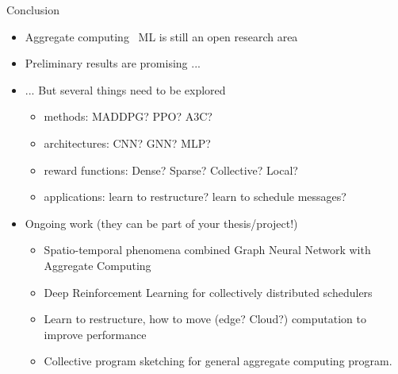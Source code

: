\documentclass[presentation, 8pt]{beamer}\mode<presentation>{\usetheme{AMSBolognaFC}}
\begin{document}
\begin{frame}{Conclusion}
\begin{itemize}
	\item Aggregate computing \faPlus \, ML is still an open research area
	\item Preliminary results are promising ...
	\item ... But several things need to be explored
	\begin{itemize}
		\item methods: MADDPG? PPO? A3C?
		\item architectures: CNN? GNN? MLP?
		\item reward functions: Dense? Sparse? Collective? Local?
		\item applications: learn to restructure? learn to schedule messages?
	\end{itemize}
	\item Ongoing work (they can be part of your thesis/project!)
	\begin{itemize}
		\item Spatio-temporal phenomena combined Graph Neural Network with Aggregate Computing
		\item Deep Reinforcement Learning for collectively distributed schedulers
		\item Learn to restructure, how to move (edge? Cloud?) computation to improve performance
		\item Collective program sketching for general aggregate computing program.
	\end{itemize}
\end{itemize}
\end{frame}
\section*{}

\frame{\titlepage}

\section*{\refname}

\end{document}
